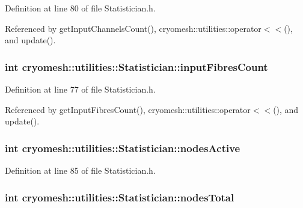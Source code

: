\-Definition at line 80 of file \-Statistician.\-h.



\-Referenced by get\-Input\-Channels\-Count(), cryomesh\-::utilities\-::operator$<$$<$(), and update().

\hypertarget{classcryomesh_1_1utilities_1_1Statistician_a12780e2d450e3013d6a8a306a4b02bd7}{
\subsubsection[{input\-Fibres\-Count}]{\setlength{\rightskip}{0pt plus 5cm}int {\bf cryomesh\-::utilities\-::\-Statistician\-::input\-Fibres\-Count}}}\label{classcryomesh_1_1utilities_1_1Statistician_a12780e2d450e3013d6a8a306a4b02bd7}


\-Definition at line 77 of file \-Statistician.\-h.



\-Referenced by get\-Input\-Fibres\-Count(), cryomesh\-::utilities\-::operator$<$$<$(), and update().

\hypertarget{classcryomesh_1_1utilities_1_1Statistician_aab51af29476bb894d8f145b8ce3d80ce}{
\subsubsection[{nodes\-Active}]{\setlength{\rightskip}{0pt plus 5cm}int {\bf cryomesh\-::utilities\-::\-Statistician\-::nodes\-Active}}}\label{classcryomesh_1_1utilities_1_1Statistician_aab51af29476bb894d8f145b8ce3d80ce}


\-Definition at line 85 of file \-Statistician.\-h.

\hypertarget{classcryomesh_1_1utilities_1_1Statistician_a4395675ddbfb598566faca1096bfe2da}{
\subsubsection[{nodes\-Total}]{\setlength{\rightskip}{0pt plus 5cm}int {\bf cryomesh\-::utilities\-::\-Statistician\-::nodes\-Total}}}\label{classcryomesh_1_1utilities_1_1Statistician_a4395675ddbfb598566faca1096bfe2da}


